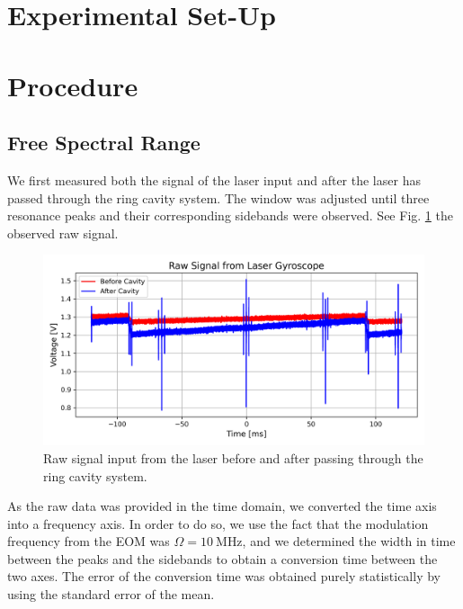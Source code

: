 \documentclass[a4paper]{report}
\numberwithin{equation}{section}
\begin{document}
\section{Experimental Set-Up}


\section{Procedure}

\subsection{Free Spectral Range}

We first measured both the signal of the laser input and after the laser
has passed through the ring cavity system. The window was adjusted until three resonance peaks and their corresponding sidebands
were observed. See Fig. \ref{fig:threeres_raw} the observed raw signal. 

\begin{figure}[h!]
	\centering
	\includegraphics[width=0.8\columnwidth]{threeres_raw.png}
	\caption{Raw signal input from the laser before and after passing through the ring 
			cavity system.}
	\label{fig:threeres_raw}
\end{figure}

As the raw data was provided in the time domain, we converted the time axis into a frequency axis.
In order to do so, we use the fact that the modulation frequency from the EOM was $\Omega = \SI{10}{\mega\hertz}$,
and we determined the width in time between the peaks and the sidebands to obtain a conversion time between 
the two axes. The error of the conversion time was obtained purely statistically by using the standard error of the mean. \par 
\end{document}
